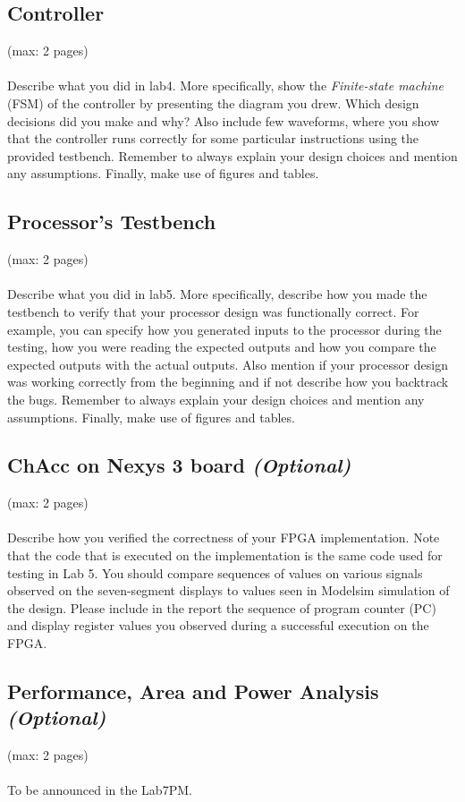 \documentclass[a4,11pt]{article}
\begin{document}
\subsection{Controller}
(max: 2 pages)
\\\\
Describe what you did in lab4. More specifically, show the \emph{Finite-state machine} (FSM) of the controller by presenting the diagram you drew. Which design decisions did you make and why? Also include few waveforms, where you show that the controller runs correctly for some particular instructions using the provided testbench. Remember to always explain your design choices and mention any assumptions. Finally, make use of figures and tables. 

\subsection{Processor's Testbench}
(max: 2 pages)
\\\\
Describe what you did in lab5. More specifically, describe how you made the testbench to verify that your processor design was functionally correct. For example, you can specify how you generated inputs to the processor during the testing, how you were reading the expected outputs and how you compare the expected outputs with the actual outputs. Also mention if your processor design was working correctly from the beginning and if not describe how you backtrack the bugs. Remember to always explain your design choices and mention any assumptions. Finally, make use of figures and tables. 

\subsection{ChAcc on Nexys 3 board \emph{(Optional)}}
(max: 2 pages)
\\\\
Describe how you verified the correctness of your FPGA implementation. Note that the code that is executed on the implementation is the same code used for testing in Lab 5. You should compare sequences of values on various signals observed on the seven-segment displays to values seen in Modelsim simulation of the design. Please include in the report the sequence of program counter (PC) and display register values you observed during a successful execution on the FPGA. 

\subsection{Performance, Area and Power Analysis \emph{(Optional)}}
(max: 2 pages)
\\\\
To be announced in the Lab7PM.
\end{document}
